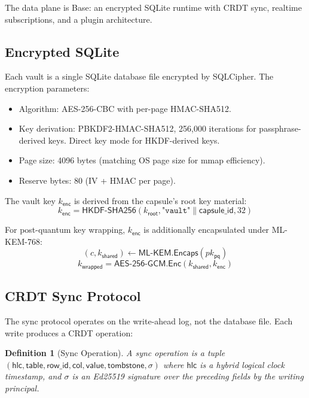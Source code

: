 \documentclass[11pt,a4paper]{article}
\newtheorem{definition}{Definition}[section]
\begin{document}
The data plane is Base: an encrypted SQLite runtime with CRDT sync, realtime
subscriptions, and a plugin architecture.

\subsection{Encrypted SQLite}

Each vault is a single SQLite database file encrypted by SQLCipher. The
encryption parameters:

\begin{itemize}[nosep]
  \item Algorithm: AES-256-CBC with per-page HMAC-SHA512.
  \item Key derivation: PBKDF2-HMAC-SHA512, 256,000 iterations for
        passphrase-derived keys. Direct key mode for HKDF-derived keys.
  \item Page size: 4096 bytes (matching OS page size for mmap efficiency).
  \item Reserve bytes: 80 (IV + HMAC per page).
\end{itemize}

The vault key $k_{\mathsf{enc}}$ is derived from the capsule's root key material:
\[
  k_{\mathsf{enc}} = \mathsf{HKDF\text{-}SHA256}(k_{\mathsf{root}},
    \texttt{"vault"} \| \mathsf{capsule\_id}, 32)
\]

For post-quantum key wrapping, $k_{\mathsf{enc}}$ is additionally encapsulated
under ML-KEM-768:
\[
  (c, k_{\mathsf{shared}}) \leftarrow \mathsf{ML\text{-}KEM.Encaps}(pk_{\mathsf{pq}})
\]
\[
  k_{\mathsf{wrapped}} = \mathsf{AES\text{-}256\text{-}GCM.Enc}(k_{\mathsf{shared}},
    k_{\mathsf{enc}})
\]

\subsection{CRDT Sync Protocol}

The sync protocol operates on the write-ahead log, not the database file.
Each write produces a CRDT operation:

\begin{definition}[Sync Operation]\label{def:syncop}
A sync operation is a tuple $(\mathsf{hlc}, \mathsf{table}, \mathsf{row\_id},
\mathsf{col}, \mathsf{value}, \mathsf{tombstone}, \sigma)$ where $\mathsf{hlc}$
is a hybrid logical clock timestamp, and $\sigma$ is an Ed25519 signature over
the preceding fields by the writing principal.
\end{definition}
\end{document}
